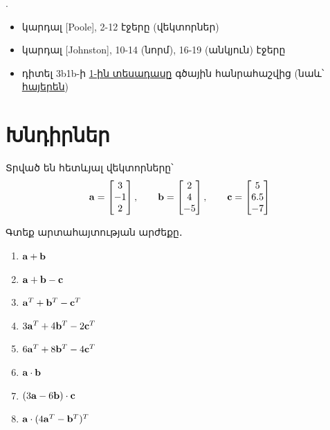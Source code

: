\bigskip 

\begin{theory}
.
\begin{itemize}
\item կարդալ [{\rm Poole}], 2-12 էջերը (վեկտորներ) 
\item կարդալ [{\rm Johnston}], 10-14 (նորմ), 16-19 (անկյուն) էջերը  
\item դիտել  {\rm 3b1b}-ի \href{https://www.3blue1brown.com/lessons/vectors}{1-ին տեսադասը} գծային հանրահաշվից (նաև՝ \href{https://youtu.be/7-r7Z2iH0Ps}{հայերեն}) 
\end{itemize}
\end{theory}

\newpage

\section{Խնդիրներ}


\begin{problem}
Տրված են հետևյալ վեկտորները՝
\[
\mathbf{a}= \begin{bmatrix} 3 \\ -1 \\ 2 \end{bmatrix}, \qquad \mathbf{b}=\begin{bmatrix} 2 \\ 4 \\ -5 \end{bmatrix}, \qquad \mathbf{c} = \begin{bmatrix}
    5 \\ 6.5 \\ -7
\end{bmatrix}
\]

Գտեք արտահայտության արժեքը․
\begin{enumerate}[label={\alph*}․]
\item $\mathbf{a}+\mathbf{b}$
\item $\mathbf{a}+\mathbf{b}-\mathbf{c}$
\item $\mathbf{a}^T+\mathbf{b}^T-\mathbf{c}^T$
\item $3\mathbf{a}^T+4\mathbf{b}^T-2\mathbf{c}^T$
\item $6\mathbf{a}^T+8\mathbf{b}^T-4\mathbf{c}^T$
\item $\mathbf{a} \cdot \mathbf{b}$
\item $(3\mathbf{a} - 6\mathbf{b}) \cdot \mathbf{c}$
\item $\mathbf{a} \cdot (4\mathbf{a}^T - \mathbf{b}^T)^T$
\end{enumerate}
\end{problem}

